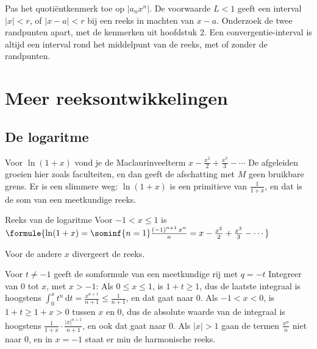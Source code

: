 \begin{werkwijze}
Pas het quotiëntkenmerk toe op $|a_n x^n|$. De voorwaarde $L < 1$ geeft een interval $|x| < r$, of $|x - a| < r$ bij een reeks in machten van $x - a$. Onderzoek de twee randpunten apart, met de kenmerken uit hoofdstuk 2. Een convergentie-interval is altijd een interval rond het middelpunt van de reeks, met of zonder de randpunten.
\end{werkwijze}


\begin{oefeningen}
\end{oefeningen}

\section{Meer reeksontwikkelingen}

\subsection{De logaritme}

Voor $\ln(1 + x)$ vond je de Maclaurinveelterm $x - \tfrac{x^2}{2} + \tfrac{x^3}{3} - \cdots$ De afgeleiden groeien hier zoals faculteiten, en dan geeft de afschatting met $M$ geen bruikbare grens. Er is een slimmere weg: $\ln(1 + x)$ is een primitieve van $\tfrac{1}{1+x}$, en dat is de som van een meetkundige reeks.

\begin{theorie}
\begin{stelling}{Reeks van de logaritme}
Voor $-1 < x \leqslant 1$ is \quad $\formule{\ln(1 + x) = \sominf{n=1} \frac{(-1)^{n+1}\,x^n}{n} = x - \frac{x^2}{2} + \frac{x^3}{3} - \cdots}$

\vspace{1mm}
Voor de andere $x$ divergeert de reeks.
\end{stelling}

\begin{bewijs}
Voor $t \neq -1$ geeft de somformule van een meetkundige rij met $q = -t$
Integreer van 0 tot $x$, met $x > -1$:
Als $0 \leqslant x \leqslant 1$, is $1 + t \geqslant 1$, dus de laatste integraal is hoogstens $\int_0^x t^n\,\mathrm{d}t = \tfrac{x^{n+1}}{n+1} \leqslant \tfrac{1}{n+1}$, en dat gaat naar 0. Als $-1 < x < 0$, is $1 + t \geqslant 1 + x > 0$ tussen $x$ en 0, dus de absolute waarde van de integraal is hoogstens $\tfrac{1}{1+x} \cdot \tfrac{|x|^{n+1}}{n+1}$, en ook dat gaat naar 0. Als $|x| > 1$ gaan de termen $\tfrac{x^n}{n}$ niet naar 0, en in $x = -1$ staat er min de harmonische reeks.
\end{bewijs}
\end{theorie}

